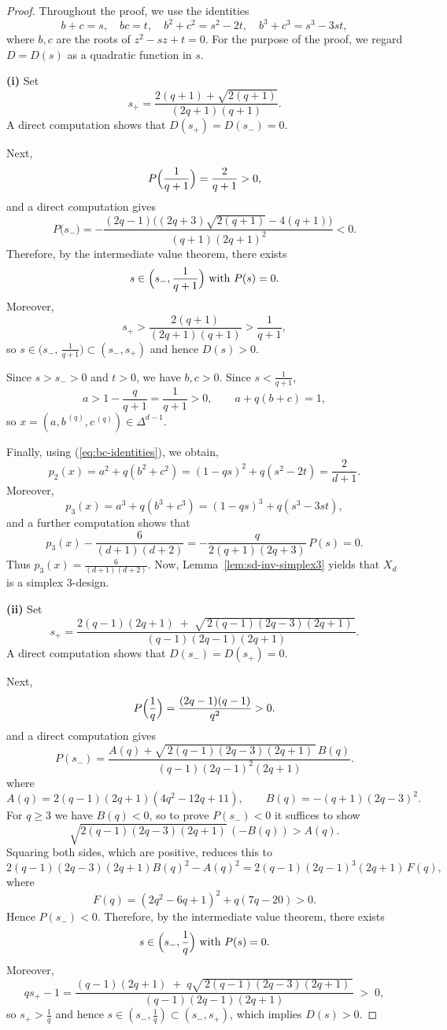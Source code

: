 \documentclass[10pt,a4paper]{amsart}
\begin{document}
\begin{proof}
Throughout the proof, we use the identities
\begin{equation}\label{eq:bc-identities}
b+c=s,\quad bc=t,\quad b^2+c^2=s^2-2t,\quad b^3+c^3=s^3-3st,
\end{equation}
where $b,c$ are the roots of $z^2-sz+t=0$.
For the purpose of the proof, we regard $D=D(s)$ as a quadratic function in $s$.

\textbf{(i)}
Set
\[
s_+=\frac{2(q+1)+\sqrt{2(q+1)}}{(2q+1)(q+1)}.
\]
A direct computation shows that $D(s_+)=D(s_-)=0$.

Next,
\[
P\Bigl(\frac1{q+1}\Bigr)=\frac{2}{q+1}>0,
\]
and a direct computation gives
\[
P\bigl(s_-\bigr)
=
-\frac{(2q-1)\bigl((2q+3)\sqrt{2(q+1)}-4(q+1)\bigr)}{(q+1)(2q+1)^2}<0.
\]
Therefore, by the intermediate value theorem, there exists
\[
s\in\Bigl(s_-,\frac1{q+1}\Bigr)\ \text{with}\ P(s)=0.
\]
Moreover,
\[
s_+>\frac{2(q+1)}{(2q+1)(q+1)}
>\frac1{q+1},
\]
so $s\in\bigl(s_-,\,\frac1{q+1}\bigr)\subset (s_-,s_+)$ and hence $D(s)>0$.

Since $s>s_->0$ and $t>0$, we have $b,c>0$.
Since $s<\frac1{q+1}$,
\[
a>1-\frac{q}{q+1}=\frac1{q+1}>0,\qquad
a+q(b+c)=1,
\]
so $x=(a,b^{\,(q)},c^{\,(q)})\in\Delta^{d-1}$.

Finally, using (\ref{eq:bc-identities}), we obtain, 
\[
p_2(x)=a^2+q(b^2+c^2)=(1-qs)^2+q(s^2-2t)=\frac{2}{d+1}.
\]
Moreover,
\[
p_3(x)=a^3+q(b^3+c^3)=(1-qs)^3+q(s^3-3st),
\]
and a further computation shows that
\[
p_3(x)-\frac{6}{(d+1)(d+2)}
=
-\frac{q}{2(q+1)(2q+3)}\,P(s)=0.
\]
Thus $p_3(x)=\frac{6}{(d+1)(d+2)}$.
Now, Lemma~\ref{lem:sd-inv-simplex3} yields that $X_d$ is a simplex $3$-design.

\textbf{(ii)}
Set
\[
s_+=\frac{2(q-1)(2q+1)\;+\;\sqrt{\,2(q-1)(2q-3)(2q+1)\,}}{(q-1)(2q-1)(2q+1)}.
\]
A direct computation shows that $D(s_-)=D(s_+)=0$.

Next,
\[
P\Bigl(\frac{1}{q}\Bigr)=\frac{(2q-1)(q-1)}{q^2}>0.
\]
and a direct computation gives
\[
P(s_-)
=\frac{A(q)+\sqrt{\,2(q-1)(2q-3)(2q+1)\,}\,B(q)}{(q-1)(2q-1)^2(2q+1)}.
\]
where
\[
A(q)=2(q-1)(2q+1)(4q^2-12q+11),\qquad
B(q)=-(q+1)(2q-3)^2.
\]
For $q\ge3$ we have $B(q)<0$, so to prove $P(s_-)<0$ it suffices to show
\[
\sqrt{2(q-1)(2q-3)(2q+1)}\,(-B(q))>A(q).
\]
Squaring both sides, which are positive, reduces this to
\[
2(q-1)(2q-3)(2q+1)B(q)^2-A(q)^2
=2(q-1)(2q-1)^3(2q+1)\,F(q),
\]
where
\[
F(q)=(2q^2-6q+1)^2+q(7q-20)>0.
\]
Hence $P(s_-)<0$.
Therefore, by the intermediate value theorem, there exists
\[
s\in\Bigl(s_-,\frac1q\Bigr)\ \text{with}\ P(s)=0.
\]
Moreover,
\[
q s_+-1
=\frac{(q-1)(2q+1)\;+\;q\sqrt{\,2(q-1)(2q-3)(2q+1)\,}}{(q-1)(2q-1)(2q+1)} \;>\;0,
\]
so $s_+>\frac1q$ and hence $s\in(s_-,\frac1q)\subset(s_-,s_+)$, which implies $D(s)>0$.


\end{proof}
\end{document}
